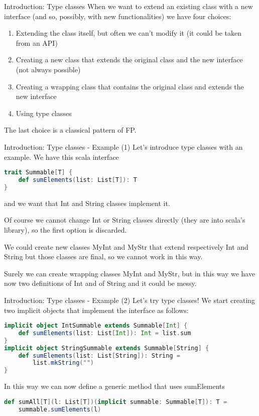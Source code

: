 \begin{frame}{Introduction: Type classes}
	When we want to extend an existing class with a new interface 
	(and so, possibly, with new functionalities) we have four choices:	
	\begin{enumerate}[<+->]
		\item Extending the class itself, but often we can't modify it (it could be taken from an API)
		\item Creating a new class that extends the original class and the new interface (not always possible)
		\item Creating a wrapping class that contains the original class and extends the new interface
		\item Using type classes
	\end{enumerate}
	\pause[4]
	The last choice is a classical pattern of FP.			
\end{frame}

\begin{frame}[fragile]{Introduction: Type classes - Example (1)}
	Let's introduce type classes with an example.
	We have this scala interface
\begin{lstlisting}[language=scala]
trait Summable[T] {
	def sumElements(list: List[T]): T
}
\end{lstlisting}
	and we want that Int and String classes implement it.

	\pause

	Of course we cannot change Int or String classes directly (they are into scala's library), so the first option is discarded.
	
	\pause
	
	We could create new classes MyInt and MyStr that extend respectively Int and String but those classes are final, so we cannot work in 
	this way.
	
	\pause
	
	Surely we can create wrapping classes MyInt and MyStr, but in this way we have now two definitions of Int and of String and it could be messy.
\end{frame}

\begin{frame}[fragile]{Introduction: Type classes - Example (2)}	
	Let's try type classes!
	We start creating two implicit objects that implement the interface as follows:
\begin{lstlisting}[language=scala]
implicit object IntSummable extends Summable[Int] {
	def sumElements(list: List[Int]): Int = list.sum
}
implicit object StringSummable extends Summable[String] {
	def sumElements(list: List[String]): String = 
		list.mkString("")
}
\end{lstlisting}

	\pause

	In this way we can now define a generic method that uses sumElements
\begin{lstlisting}[language=scala]
def sumAll[T](l: List[T])(implicit summable: Summable[T]): T =
	summable.sumElements(l)		
\end{lstlisting}	
\end{frame}

